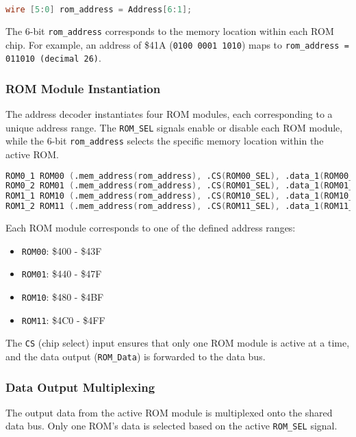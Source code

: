 \begin{lstlisting}[language=Verilog, caption={Internal Address Mapping}]
wire [5:0] rom_address = Address[6:1];
\end{lstlisting}

The 6-bit \texttt{rom\_address} corresponds to the memory location within each ROM chip. For example, an address of \$41A (\texttt{0100 0001 1010}) maps to \texttt{rom\_address = 011010 (decimal 26)}.

\subsubsection{ROM Module Instantiation}
The address decoder instantiates four ROM modules, each corresponding to a unique address range. The \texttt{ROM\_SEL} signals enable or disable each ROM module, while the 6-bit \texttt{rom\_address} selects the specific memory location within the active ROM.

\begin{lstlisting}[language=Verilog, caption={ROM Module Instantiation}]
ROM0_1 ROM00 (.mem_address(rom_address), .CS(ROM00_SEL), .data_1(ROM00_Data));
ROM0_2 ROM01 (.mem_address(rom_address), .CS(ROM01_SEL), .data_1(ROM01_Data));
ROM1_1 ROM10 (.mem_address(rom_address), .CS(ROM10_SEL), .data_1(ROM10_Data));
ROM1_2 ROM11 (.mem_address(rom_address), .CS(ROM11_SEL), .data_1(ROM11_Data));
\end{lstlisting}

Each ROM module corresponds to one of the defined address ranges:
\begin{itemize}
    \item \texttt{ROM00}: \$400 - \$43F
    \item \texttt{ROM01}: \$440 - \$47F
    \item \texttt{ROM10}: \$480 - \$4BF
    \item \texttt{ROM11}: \$4C0 - \$4FF
\end{itemize}
The \texttt{CS} (chip select) input ensures that only one ROM module is active at a time, and the data output (\texttt{ROM\_Data}) is forwarded to the data bus.

\subsubsection{Data Output Multiplexing}
The output data from the active ROM module is multiplexed onto the shared data bus. Only one ROM's data is selected based on the active \texttt{ROM\_SEL} signal.

